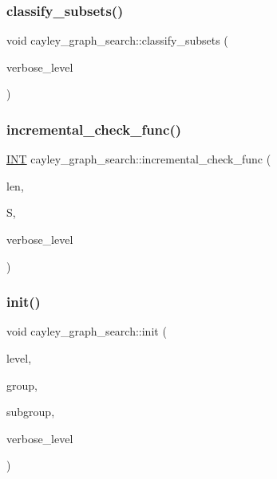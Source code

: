 \subsubsection{\texorpdfstring{classify\+\_\+subsets()}{classify\_subsets()}}
{\footnotesize\ttfamily void cayley\+\_\+graph\+\_\+search\+::classify\+\_\+subsets (\begin{DoxyParamCaption}\item[{\mbox{\hyperlink{galois_8h_a09fddde158a3a20bd2dcadb609de11dc}{I\+NT}}}]{verbose\+\_\+level }\end{DoxyParamCaption})}

\mbox{\label{classcayley__graph__search_a08a8cbcdf9882d832477d451a2a58c1f}} 
\subsubsection{\texorpdfstring{incremental\+\_\+check\+\_\+func()}{incremental\_check\_func()}}
{\footnotesize\ttfamily \mbox{\hyperlink{galois_8h_a09fddde158a3a20bd2dcadb609de11dc}{I\+NT}} cayley\+\_\+graph\+\_\+search\+::incremental\+\_\+check\+\_\+func (\begin{DoxyParamCaption}\item[{\mbox{\hyperlink{galois_8h_a09fddde158a3a20bd2dcadb609de11dc}{I\+NT}}}]{len,  }\item[{\mbox{\hyperlink{galois_8h_a09fddde158a3a20bd2dcadb609de11dc}{I\+NT}} $\ast$}]{S,  }\item[{\mbox{\hyperlink{galois_8h_a09fddde158a3a20bd2dcadb609de11dc}{I\+NT}}}]{verbose\+\_\+level }\end{DoxyParamCaption})}

\mbox{\label{classcayley__graph__search_add9c6434abeaebac4a07bc03cb21672d}} 
\subsubsection{\texorpdfstring{init()}{init()}}
{\footnotesize\ttfamily void cayley\+\_\+graph\+\_\+search\+::init (\begin{DoxyParamCaption}\item[{\mbox{\hyperlink{galois_8h_a09fddde158a3a20bd2dcadb609de11dc}{I\+NT}}}]{level,  }\item[{\mbox{\hyperlink{galois_8h_a09fddde158a3a20bd2dcadb609de11dc}{I\+NT}}}]{group,  }\item[{\mbox{\hyperlink{galois_8h_a09fddde158a3a20bd2dcadb609de11dc}{I\+NT}}}]{subgroup,  }\item[{\mbox{\hyperlink{galois_8h_a09fddde158a3a20bd2dcadb609de11dc}{I\+NT}}}]{verbose\+\_\+level }\end{DoxyParamCaption})}

